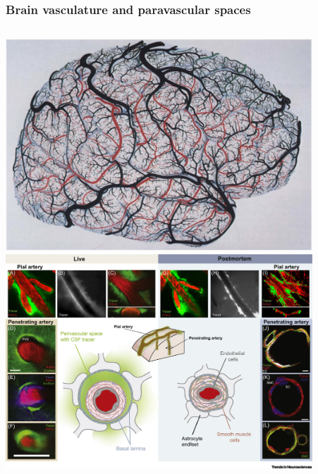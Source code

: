 \documentclass[mathserif, aspectratio=169]{beamer}
\begin{document}
\begin{frame}
  \frametitle{Brain vasculature and paravascular spaces}
  \vspace{-1em}
  \begin{columns}[c]
      \begin{column}{0.4\textwidth}
      \begin{center}
        \includegraphics[width=0.9\textwidth]{graphics/uludag_et_al_2018_fig2.jpg} \\
        \includegraphics[width=0.9\textwidth]{graphics/mestre_mori_nedergaard_2020_fig2.jpg}
      \end{center}
      \end{column}
      \begin{column}{0.6\textwidth}
      \begin{center}

\end{center}
\end{column}
\end{columns}
\end{frame}
\end{document}
